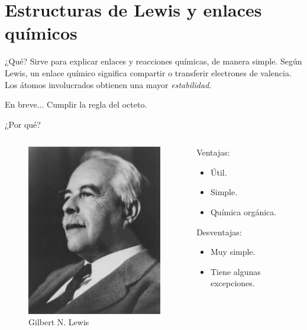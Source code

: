 \documentclass{beamer}
\begin{document}
  \section{Estructuras de Lewis y enlaces químicos}
  \begin{frame}{¿Qué?}
    Sirve para explicar enlaces y reacciones químicas, de manera simple. Según Lewis, un enlace químico significa compartir o transferir electrones de valencia. Los átomos involucrados obtienen una mayor \emph{estabilidad}.
    \begin{block}{En breve...}
      Cumplir la regla del octeto.
    \end{block}
  \end{frame}
  \begin{frame}{¿Por qué?}
    \begin{columns}
      \begin{column}{0.5\textwidth}
        \begin{figure}
          \centering
          \includegraphics[width=0.7\linewidth]{imgs/Gilbert_N_Lewis}
          \caption{Gilbert N. Lewis}
          \label{fig:gilbertnlewis}
        \end{figure}
      \end{column}
      \begin{column}{0.5\textwidth}
        Ventajas:
        \begin{itemize}
          \item Útil.
          \item Simple.
          \item Química orgánica.
        \end{itemize}
        Desventajas:
        \begin{itemize}
          \item Muy simple.
          \item Tiene algunas excepciones.
        \end{itemize}
      \end{column}
    \end{columns}
  \end{frame}
\end{document}
